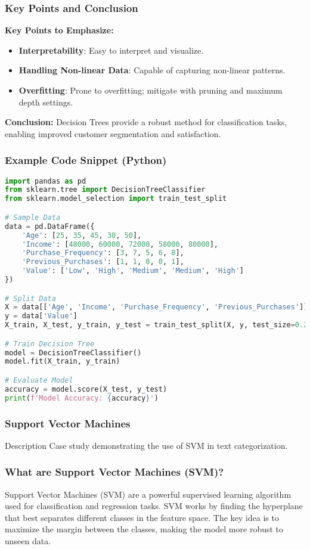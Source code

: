 \documentclass{beamer}
\begin{document}
\begin{frame}[fragile]
    \frametitle{Key Points and Conclusion}
    \textbf{Key Points to Emphasize:}
    \begin{itemize}
        \item \textbf{Interpretability}: Easy to interpret and visualize.
        \item \textbf{Handling Non-linear Data}: Capable of capturing non-linear patterns.
        \item \textbf{Overfitting}: Prone to overfitting; mitigate with pruning and maximum depth settings.
    \end{itemize}

    \textbf{Conclusion:}  
    Decision Trees provide a robust method for classification tasks, enabling improved customer segmentation and satisfaction.
\end{frame}

\begin{frame}[fragile]
    \frametitle{Example Code Snippet (Python)}
    \begin{lstlisting}[language=Python]
import pandas as pd
from sklearn.tree import DecisionTreeClassifier
from sklearn.model_selection import train_test_split

# Sample Data
data = pd.DataFrame({
    'Age': [25, 35, 45, 30, 50],
    'Income': [48000, 60000, 72000, 58000, 80000],
    'Purchase_Frequency': [3, 7, 5, 6, 8],
    'Previous_Purchases': [1, 1, 0, 0, 1],
    'Value': ['Low', 'High', 'Medium', 'Medium', 'High']
})

# Split Data
X = data[['Age', 'Income', 'Purchase_Frequency', 'Previous_Purchases']]
y = data['Value']
X_train, X_test, y_train, y_test = train_test_split(X, y, test_size=0.2)

# Train Decision Tree
model = DecisionTreeClassifier()
model.fit(X_train, y_train)

# Evaluate Model
accuracy = model.score(X_test, y_test)
print(f'Model Accuracy: {accuracy}')
    \end{lstlisting}
\end{frame}

\begin{frame}[fragile]
    \frametitle{Support Vector Machines}
    \begin{block}{Description}
        Case study demonstrating the use of SVM in text categorization.
    \end{block}
\end{frame}

\begin{frame}[fragile]
    \frametitle{What are Support Vector Machines (SVM)?}
    Support Vector Machines (SVM) are a powerful supervised learning algorithm used for classification and regression tasks. SVM works by finding the hyperplane that best separates different classes in the feature space. The key idea is to maximize the margin between the classes, making the model more robust to unseen data.
\end{frame}
\end{document}
